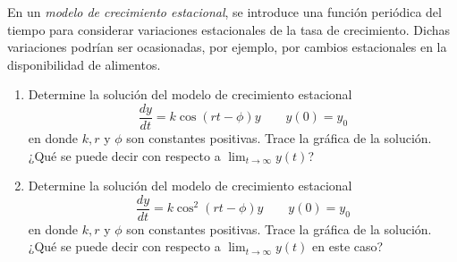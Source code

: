 \item En un \textit{modelo de crecimiento estacional}, se introduce una función periódica del tiempo para considerar variaciones estacionales de la tasa de crecimiento. Dichas variaciones podrían ser ocasionadas, por ejemplo, por cambios estacionales en la disponibilidad de alimentos.
    \begin{enumerate}
        \item[(a)] Determine la solución del modelo de crecimiento estacional
        \[ \frac{dy}{dt} = k \cos(rt - \phi)y \qquad y(0) = y_0 \]
        en donde $k, r$ y $\phi$ son constantes positivas. Trace la gráfica de la solución. ¿Qué se puede decir con respecto a $\lim_{t\to\infty} y(t)$?
        \item[(b)] Determine la solución del modelo de crecimiento estacional
        \[ \frac{dy}{dt} = k \cos^2(rt - \phi)y \qquad y(0) = y_0 \]
        en donde $k, r$ y $\phi$ son constantes positivas. Trace la gráfica de la solución. ¿Qué se puede decir con respecto a $\lim_{t\to\infty} y(t) $ en este caso?
    \end{enumerate}
